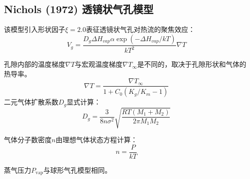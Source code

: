 \subsection{Nichols (1972) 透镜状气孔模型}

该模型引入形状因子$\xi=2.0$表征透镜状气孔对热流的聚焦效应：
\begin{equation}
V_g = \frac{D_g \Delta H_{vap} \alpha \exp(-\Delta H_{vap}/kT)}{k T^2} \nabla T
\label{eq:app_b_nichols1972_migration_velocity}
\end{equation}

孔隙内部的温度梯度$\nabla T$与宏观温度梯度$\nabla T_\infty$是不同的，取决于孔隙形状和气体的热导率。
\begin{equation}
\nabla T = \frac{\nabla T_\infty}{1 + C_0 (K_g/K_m - 1)}
\label{eq:app_b_nichols1972_temperature_gradient}
\end{equation}
二元气体扩散系数$D_g$显式计算：
\begin{equation}
D_g = \frac{3}{8 n \sigma^2} \sqrt{\frac{R T (M_1 + M_2)}{2\pi M_1 M_2}}
\label{eq:app_b_nichols1972_binary_diffusivity}
\end{equation}

气体分子数密度$n$由理想气体状态方程计算：
\begin{equation}
n = \frac{P}{k T}
\label{eq:app_b_nichols1972_number_density}
\end{equation}

蒸气压力$P_{\text{vap}}$与球形气孔模型相同。

